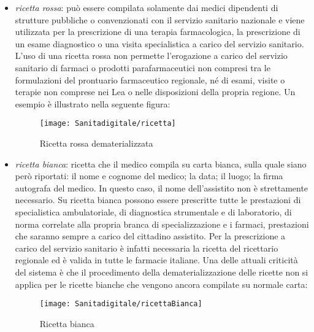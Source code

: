 \begin{itemize}
	\item \emph{\gls{ricetta rossa}}: può essere compilata solamente dai medici dipendenti di strutture pubbliche o convenzionati con il servizio sanitario nazionale e viene utilizzata per la prescrizione di una terapia farmacologica, la prescrizione di un esame diagnostico o una visita specialistica a carico del servizio sanitario. L’uso di una ricetta rossa non permette l’erogazione a carico del servizio sanitario di farmaci o prodotti parafarmaceutici non compresi tra le formulazioni del prontuario farmaceutico regionale, né di esami, visite o terapie non comprese nei Lea o nelle disposizioni della propria regione. Un esempio è illustrato nella seguente figura:
	      \newline
	      \begin{figure}[h!]
	      	\centering
	      	\texttt{[image: Sanitadigitale/ricetta]}
	      	\caption{Ricetta rossa dematerializzata}
	      	\label{fig:Ricetta rossa dematerializzata}
	      \end{figure}
	      \newline
	\item \emph{\gls{ricetta bianca}}: ricetta che il medico compila su carta bianca, sulla quale siano però riportati: il nome e cognome del medico; la data; il luogo; la firma autografa del medico. In questo caso, il nome dell’assistito non è strettamente necessario. Su ricetta bianca possono essere prescritte tutte le prestazioni di specialistica ambulatoriale, di diagnostica strumentale e di laboratorio, di norma correlate alla propria branca di specializzazione e i farmaci, prestazioni che saranno sempre a carico del cittadino assistito. Per la prescrizione a carico del servizio sanitario è infatti necessaria la ricetta del ricettario regionale ed è valida in tutte le farmacie italiane. Una delle attuali criticità del sistema è che il procedimento della dematerializzazione delle ricette non si applica per le ricette bianche che vengono ancora compilate su normale carta:
	      \begin{center}
	      	\begin{figure}[tbhp]
	      		\centering
	      		\texttt{[image: Sanitadigitale/ricettaBianca]}
	      		\caption{Ricetta bianca}
	      		\label{fig:Ricetta bianca}
	      	\end{figure}
	      \end{center}
\end{itemize}
%
